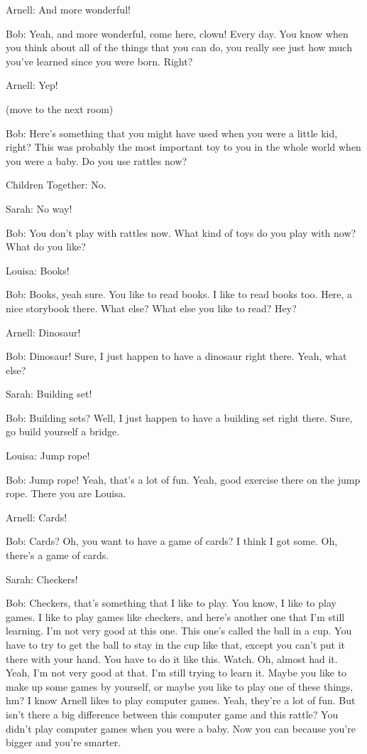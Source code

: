 Arnell: And more wonderful!

Bob: Yeah, and more wonderful, come here, clown! Every day. You know when you think about all of the things that you can do, you really see just how much you've learned since you were born. Right?

Arnell: Yep!

(move to the next room)

Bob: Here's something that you might have used when you were a little kid, right? This was probably the most important toy to you in the whole world when you were a baby. Do you use rattles now?

Children Together: No.

Sarah: No way!

Bob: You don't play with rattles now. What kind of toys do you play with now? What do you like?

Louisa: Books!

Bob: Books, yeah sure. You like to read books. I like to read books too. Here, a nice storybook there. What else? What else you like to read? Hey?

Arnell: Dinosaur!

Bob: Dinosaur! Sure, I just happen to have a dinosaur right there. Yeah, what else?

Sarah: Building set!

Bob: Building sets? Well, I just happen to have a building set right there. Sure, go build yourself a bridge.

Louisa: Jump rope!

Bob: Jump rope! Yeah, that's a lot of fun. Yeah, good exercise there on the jump rope. There you are Louisa.

Arnell: Cards!

Bob: Cards? Oh, you want to have a game of cards? I think I got some. Oh, there's a game of cards.

Sarah: Checkers!

Bob: Checkers, that's something that I like to play. You know, I like to play games. I like to play games like checkers, and here's another one that I'm still learning. I'm not very good at this one. This one's called the ball in a cup. You have to try to get the ball to stay in the cup like that, except you can't put it there with your hand. You have to do it like this. Watch. Oh, almost had it. Yeah, I'm not very good at that. I'm still trying to learn it. Maybe you like to make up some games by yourself, or maybe you like to play one of these things, hm? I know Arnell likes to play computer games. Yeah, they're a lot of fun. But isn't there a big difference between this computer game and this rattle? You didn't play computer games when you were a baby. Now you can because you're bigger and you're smarter.

